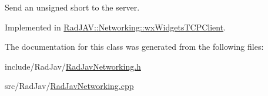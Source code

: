Send an unsigned short to the server. 



Implemented in \mbox{\hyperlink{class_rad_j_a_v_1_1_networking_1_1wx_widgets_t_c_p_client_a909ddced28c91178cfc77be15e79751d}{Rad\+J\+A\+V\+::\+Networking\+::wx\+Widgets\+T\+C\+P\+Client}}.



The documentation for this class was generated from the following files\+:\begin{DoxyCompactItemize}
\item 
include/\+Rad\+Jav/\mbox{\hyperlink{_rad_jav_networking_8h}{Rad\+Jav\+Networking.\+h}}\item 
src/\+Rad\+Jav/\mbox{\hyperlink{_rad_jav_networking_8cpp}{Rad\+Jav\+Networking.\+cpp}}\end{DoxyCompactItemize}
